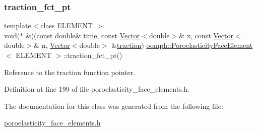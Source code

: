 \subsubsection{\texorpdfstring{traction\+\_\+fct\+\_\+pt}{traction\_fct\_pt}}
{\footnotesize\ttfamily template$<$class E\+L\+E\+M\+E\+NT $>$ \\
void($\ast$ \&)(const double\& time, const \hyperlink{classoomph_1_1Vector}{Vector}$<$double$>$\& x, const \hyperlink{classoomph_1_1Vector}{Vector}$<$double$>$\& n, \hyperlink{classoomph_1_1Vector}{Vector}$<$double$>$ \&\hyperlink{classoomph_1_1PoroelasticityFaceElement_a1e82041ba48cda7bc31aa65165cf8208}{traction}) \hyperlink{classoomph_1_1PoroelasticityFaceElement}{oomph\+::\+Poroelasticity\+Face\+Element}$<$ E\+L\+E\+M\+E\+NT $>$\+::traction\+\_\+fct\+\_\+pt()\hspace{0.3cm}{\ttfamily [inline]}}



Reference to the traction function pointer. 



Definition at line 199 of file poroelasticity\+\_\+face\+\_\+elements.\+h.



The documentation for this class was generated from the following file\+:\begin{DoxyCompactItemize}
\item 
\hyperlink{poroelasticity__face__elements_8h}{poroelasticity\+\_\+face\+\_\+elements.\+h}\end{DoxyCompactItemize}
